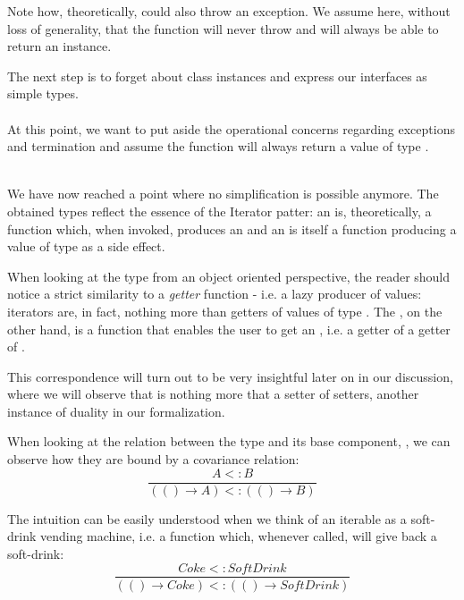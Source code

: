 Note how, theoretically,  could also throw an exception. We assume here, without loss of generality, that the function will never throw and will always be able to return an  instance.

The next step is to forget about class instances and express our interfaces as simple types.\\

\\

At this point, we want to put aside the operational concerns regarding exceptions and termination and assume the  function will always return a value of type .

\\

We have now reached a point where no simplification is possible anymore. The obtained types reflect the essence of the Iterator patter: an  is, theoretically, a function which, when invoked, produces an  and an  is itself a function producing a value of type  as a side effect. 

When looking at the  type from an object oriented perspective, the reader should notice a strict similarity to a \textit{getter} function - i.e. a lazy producer of values: iterators are, in fact, nothing more than getters of values of type . The , on the other hand, is a function that enables the user to get an , i.e. a getter of a getter of .

This correspondence will turn out to be very insightful later on in our discussion, where we will observe that  is nothing more that a setter of setters, another instance of duality in our formalization. 

When looking at the relation between the  type and its base component, , we can observe how they are bound by a covariance relation:\\
\begin{displaymath}
\frac{A <: B}{(() \rightarrow A) <: (() \rightarrow B)} 
\end{displaymath}

The intuition can be easily understood when we think of an iterable as a soft-drink vending machine, i.e. a function which, whenever called, will give back a soft-drink:\\ 
\begin{displaymath}
\frac{Coke <: Soft Drink}{(() \rightarrow Coke) <: (() \rightarrow Soft Drink)} 
\end{displaymath}

